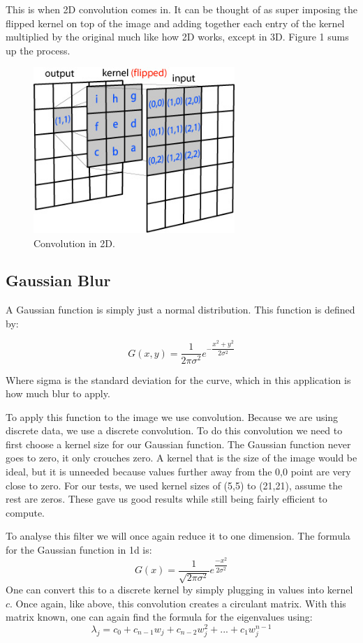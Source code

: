 \documentclass[11pt]{article}
\begin{document}
This is when 2D convolution comes in. It can be thought of as super imposing the flipped kernel on top of the image and adding together each entry of the kernel multiplied by the original much like how 2D works, except in 3D.
Figure 1 sums up the process.

\begin{figure}[Htp]
\includegraphics[width=3in]{conv2d_matrix.jpg}
\caption{Convolution in 2D.}
\label{}
\end{figure}

\subsection{Gaussian Blur}
A Gaussian function is simply just a normal distribution. This function is defined by:

$$
G(x,y) = \dfrac{1}{2\pi \sigma^2}e^{-\dfrac{x^2+y^2}{2 \sigma^2}}$$

Where sigma is the standard deviation for the curve, which in this application is how much blur to apply.

To apply this function to the image we use convolution. Because we are using discrete data, we use a discrete convolution. To do this convolution we need to first choose a kernel size for our Gaussian function. The Gaussian function never goes to zero, it only crouches zero. A kernel that is the size of the image would be ideal, but it is unneeded because values further away from the 0,0 point are very close to zero. For our tests, we used kernel sizes of (5,5) to (21,21), assume the rest are zeros. These gave us good results while still being fairly efficient to compute. 

To analyse this filter we will once again reduce it to one dimension. The formula for the Gaussian function in 1d is:  
$$ G(x) = \dfrac{1}{\sqrt{2\pi \sigma^2}}e^{\dfrac{-x^2}{2\sigma^2}} $$
One can convert this to a discrete kernel by simply plugging in values into kernel $c$.
Once again, like above, this convolution creates a circulant matrix. With this matrix known, one can again find the formula for the eigenvalues using:
$$\lambda_j = c_0+c_{n-1}w_j+c_{n-2}w_j^2 + ... + c_1w_j^{n-1}$$
\end{document}
